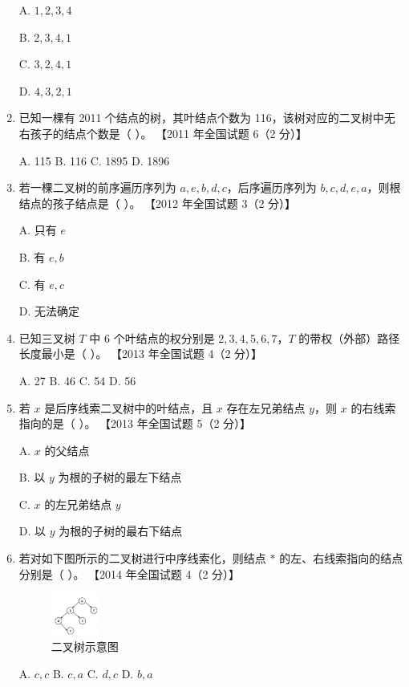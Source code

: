 \documentclass[lang=cn,newtx,10pt,scheme=chinese]{elegantbook}
\begin{document}
\begin{enumerate}
    A. $1, 2, 3, 4$  

    B. $2, 3, 4, 1$  

    C. $3, 2, 4, 1$  

    D. $4, 3, 2, 1$  

    \item 已知一棵有 2011 个结点的树，其叶结点个数为 116，该树对应的二叉树中无右孩子的结点个数是（ ）。  
    【2011 年全国试题 6（2 分）】  

    A. 115 \quad B. 116 \quad C. 1895 \quad D. 1896  

    \item 若一棵二叉树的前序遍历序列为 $a,e,b,d,c$，后序遍历序列为 $b,c,d,e,a$，则根结点的孩子结点是（ ）。  
    【2012 年全国试题 3（2 分）】 

    A. 只有 $e$  

    B. 有 $e, b$  

    C. 有 $e, c$  

    D. 无法确定  

    \item 已知三叉树 $T$ 中 6 个叶结点的权分别是 $2, 3, 4, 5, 6, 7$，$T$ 的带权（外部）路径长度最小是（ ）。  
    【2013 年全国试题 4（2 分）】 

    A. 27 \quad B. 46 \quad C. 54 \quad D. 56  

    \item 若 $x$ 是后序线索二叉树中的叶结点，且 $x$ 存在左兄弟结点 $y$，则 $x$ 的右线索指向的是（ ）。  
    【2013 年全国试题 5（2 分）】 

    A. $x$ 的父结点  

    B. 以 $y$ 为根的子树的最左下结点  

    C. $x$ 的左兄弟结点 $y$  

    D. 以 $y$ 为根的子树的最右下结点  

    \item 若对如下图所示的二叉树进行中序线索化，则结点 $*$ 的左、右线索指向的结点分别是（ ）。  
    【2014 年全国试题 4（2 分）】
    \begin{figure}[h!]
            \centering
            \includegraphics[width=0.15\textwidth]{./figure/exercisePicPDF/chapter6/6-20.pdf}
            \caption{二叉树示意图}
    \end{figure}

    A. $c, c$ \quad B. $c, a$ \quad C. $d, c$ \quad D. $b, a$  


\end{enumerate}
\end{document}
